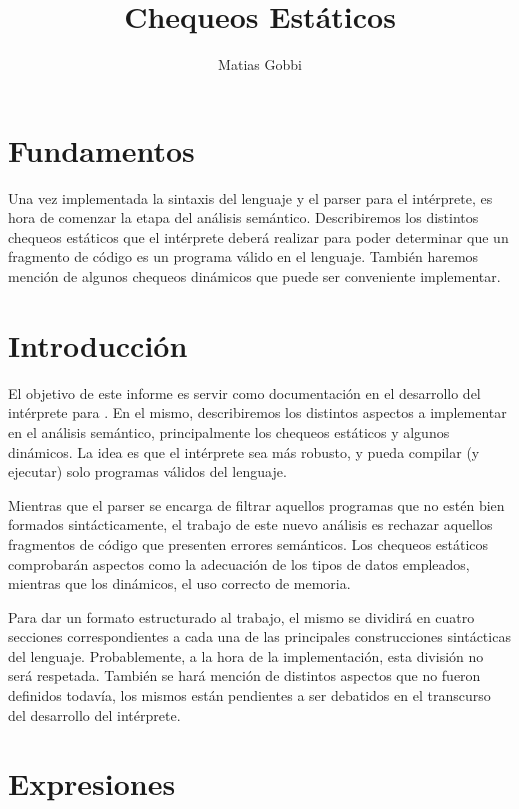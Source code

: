 \documentclass{article}
\begin{document}
\title{Chequeos Estáticos}
\author{Matias Gobbi}
\maketitle

\section*{Fundamentos}

Una vez implementada la sintaxis del lenguaje y el parser para el intérprete, es hora de comenzar la etapa del análisis semántico.
Describiremos los distintos chequeos estáticos que el intérprete deberá realizar para poder determinar que un fragmento de código es un programa válido en el lenguaje.
También haremos mención de algunos chequeos dinámicos que puede ser conveniente implementar.

\section{Introducción}

El objetivo de este informe es servir como documentación en el desarrollo del intérprete para \Lang.
En el mismo, describiremos los distintos aspectos a implementar en el análisis semántico, principalmente los chequeos estáticos y algunos dinámicos.
La idea es que el intérprete sea más robusto, y pueda compilar (y ejecutar) solo programas válidos del lenguaje.

Mientras que el parser se encarga de filtrar aquellos programas que no estén bien formados sintácticamente, el trabajo de este nuevo análisis es rechazar aquellos fragmentos de código que presenten errores semánticos.
Los chequeos estáticos comprobarán aspectos como la adecuación de los tipos de datos empleados, mientras que los dinámicos, el uso correcto de memoria.

Para dar un formato estructurado al trabajo, el mismo se dividirá en cuatro secciones correspondientes a cada una de las principales construcciones sintácticas del lenguaje.
Probablemente, a la hora de la implementación, esta división no será respetada.
También se hará mención de distintos aspectos que no fueron definidos todavía, los mismos están pendientes a ser debatidos en el transcurso del desarrollo del intérprete.

\section{Expresiones}
\end{document}
